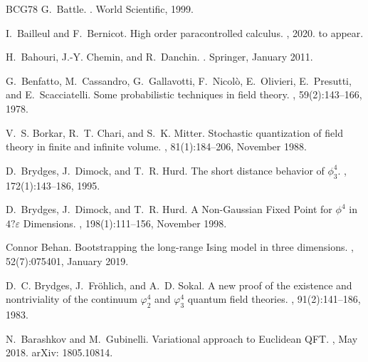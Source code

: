 \documentclass[a4paper,11pt]{article}
\numberwithin{equation}{section}
\begin{document}
\begin{thebibliography}{BCG{\etalchar{+}}78}
G.~Battle.
.
\newblock World Scientific, 1999.

I.~Bailleul and F.~Bernicot.
\newblock High order paracontrolled calculus.
, 2020.
\newblock to appear.

H.~Bahouri, J.-Y. Chemin, and R.~Danchin.
.
\newblock Springer, January 2011.

G.~Benfatto, M.~Cassandro, G.~Gallavotti, F.~Nicol\`o, E.~Olivieri,
  E.~Presutti, and E.~Scacciatelli.
\newblock Some probabilistic techniques in field theory.
, 59(2):143--166, 1978.

V.~S. Borkar, R.~T. Chari, and S.~K. Mitter.
\newblock Stochastic quantization of field theory in finite and infinite
  volume.
, 81(1):184--206, November 1988.

D.~Brydges, J.~Dimock, and T.~R. Hurd.
\newblock The short distance behavior of $\phi^4_3$.
, 172(1):143--186, 1995.

D.~Brydges, J.~Dimock, and T.~R. Hurd.
\newblock A {Non}-{Gaussian} {Fixed} {Point} for $\phi^4$ in $4?\varepsilon$
  {Dimensions}.
, 198(1):111--156,
  November 1998.

Connor Behan.
\newblock Bootstrapping the long-range {Ising} model in three dimensions.
,
  52(7):075401, January 2019.

D.~C. Brydges, J.~Fr\"{o}hlich, and A.~D. Sokal.
\newblock A new proof of the existence and nontriviality of the continuum
  {$\varphi ^{4}_{2}$} and {$\varphi ^{4}_{3}$} quantum field theories.
, 91(2):141--186, 1983.

N.~Barashkov and M.~Gubinelli.
\newblock Variational approach to {Euclidean} {QFT}.
, May 2018.
\newblock arXiv: 1805.10814.


\end{thebibliography}
\end{document}
